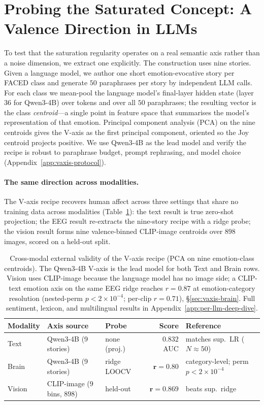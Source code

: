 \section{Probing the Saturated Concept: A Valence Direction in LLMs}
\label{sec:vaxis-llms}

To test that the saturation regularity operates on a real semantic
axis rather than a noise dimension, we extract one explicitly. The
construction uses nine stories. Given a language model, we author
one short emotion-evocative story per FACED class and generate $50$
paraphrases per story by independent LLM calls. For each class we
mean-pool the language model's final-layer hidden state (layer $36$ for
Qwen3-4B) over tokens and over all $50$ paraphrases; the resulting vector is
the class \emph{centroid}---a single point in feature space that
summarises the model's representation of that emotion. Principal
component analysis (PCA) on the nine centroids gives the V-axis as
the first principal component, oriented so the Joy centroid projects
positive. We use Qwen3-4B as the lead model and verify the recipe is
robust to paraphrase budget, prompt rephrasing, and model choice
(Appendix~\ref{app:vaxis-protocol}).

\paragraph{The same direction across modalities.}
The V-axis recipe recovers human affect across three settings that
share no training data across modalities (Table~\ref{tab:cross-modal}):
the text result is true zero-shot projection; the EEG result re-extracts
the nine-story recipe with a ridge probe; the vision result forms nine
valence-binned CLIP-image centroids over $898$ images, scored on a
held-out split.

\begin{table}[h]
\centering
\small
\setlength{\tabcolsep}{4pt}
\begin{tabular}{@{}lllrl@{}}
\toprule
Modality & Axis source & Probe & Score & Reference \\
\midrule
Text   & Qwen3-4B (9 stories) & none (proj.) & $\mathbf{0.832}$ AUC & matches sup.\ LR ($N{\approx}50$) \\
Brain  & Qwen3-4B (9 stories) & ridge LOOCV & $\mathbf{r{=}0.80}$ & category-level; perm $p<2{\times}10^{-4}$ \\
Vision & CLIP-image ($9$ bins, $898$) & held-out & $\mathbf{r{=}0.869}$ & beats sup.\ ridge \\
\bottomrule
\end{tabular}
\caption{Cross-modal external validity of the V-axis recipe (PCA on
nine emotion-class centroids). The Qwen3-4B V-axis is the lead model
for both Text and Brain rows. Vision uses CLIP-image because the
language model has no image side; a CLIP-text emotion axis
on the same EEG ridge reaches $r{=}0.87$ at emotion-category resolution
(nested-perm $p<2{\times}10^{-4}$; per-clip $r{=}0.71$),
\S\ref{sec:vaxis-brain}. Full sentiment, lexicon, and multilingual
results in Appendix~\ref{app:per-llm-deep-dive}.}
\label{tab:cross-modal}
\end{table}

